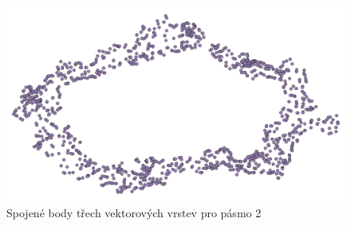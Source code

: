 \begin{figure}[H] \centering
    \includegraphics[width=400pt]{./pictures/merged.png}
    \caption[Spojené body třech vektorových vrstev pro pásmo 2]{Spojené body třech vektorových vrstev pro pásmo 2}
	\label{fig:merged}              
\end{figure} 
% 
% 
